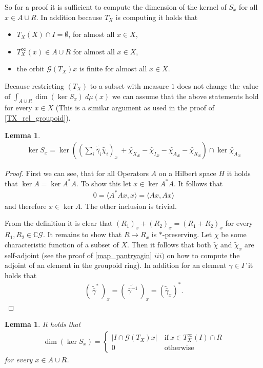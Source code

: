 \documentclass[12pt,a4paper]{scrartcl}
\theoremstyle{plain}
\newtheorem{Lemma}[Theorem]{Lemma}
\theoremstyle{definition}
\newcommand{\C}{\mathbb{C}} %
\newcommand{\2}{\mathbb{Z} / 2 \mathbb{Z}}
\newcommand{\G}{\mathcal{G}}
\newcommand{\1}{\bar{1}}
\newcommand{\0}{\bar{0}}
\begin{document}
So for a proof it is sufficient to compute the dimension of the kernel of $S_x$ for all $x \in A \cup R$. In addition because $T_X$ is computing it holds that
\begin{itemize}
	\item $T_X(X) \cap I= \emptyset$, for almost all $x \in X$,
	\item $T_X^\infty(x) \in A \cup R$ for almost all $x \in X$,
	\item the orbit $\G (T_X)x$ is finite for almost all $x \in X$.
\end{itemize}
Because restricting $(T_X)$ to a subset with measure $1$ does not change the value of $\int_{A \cup R} \dim (\ker S_x) \ d \mu (x)$ we can assume that the above statements hold for every $x \in X$ (This is a similar argument as used in the proof of \ref{TX_rel_groupoid}).
\begin{Lemma}
	\begin{align*}
	\ker S_x = \ker((\sum_{i} \widetilde{\bar{\gamma_i}} \widetilde{\chi_i})_x \ + \widetilde{\chi_X}_x - \widetilde{\chi_I}_x - \widetilde{\chi_A}_x - \widetilde{\chi_R}_x) \cap \ker \widetilde{\chi_A}_x
	\end{align*}
\end{Lemma}
\begin{proof}
	First we can see, that for all Operators $A$ on a Hilbert space $H$ it holds that $\ker A = \ker A^*A$. To show this let $x \in \ker A^*A$. It follows that
	\begin{align*}
		0 = \langle A^*Ax, x \rangle = \langle Ax, Ax \rangle
	\end{align*}
	and therefore $x \in \ker A$. The other inclusion is trivial. 
	
	From the definition it is clear that $(R_1)_x + (R_2)_x = (R_1 + R_2)_x$ for every $R_1, R_2 \in \C \G$. It remains to show that $R \mapsto R_x$ is $*$-preserving. Let $\chi$ be some characteristic function of a subset of $X$. Then it follows that both $\widetilde{\chi}$ and $\widetilde{\chi}_x$ are self-adjoint (see the proof of \ref{map_pantryagin} $iii)$ on how to compute the adjoint of an element in the groupoid ring). In addition for an element $\gamma \in \Gamma$ it holds that 
	\begin{align*}
		(~\widetilde{\bar{\gamma}}^{*}~)_x = (~\widetilde{\bar{\gamma}^{-1}}~)_x = (\widetilde {\bar{\gamma}}_x)^{*}.
	\end{align*}
\end{proof}
\begin{Lemma} \label{kerSx_berechnen}
	It holds that
	\begin{align*}
		\dim (\ker S_x) = \begin{cases}
		|I \cap \G (T_X)x| &~ \text{if} ~ x \in T_X^\infty(I) \cap R\\
		0 &~ \text{otherwise} 
		\end{cases}
	\end{align*}
	for every $x \in A \cup R$.
\end{Lemma}
\end{document}
